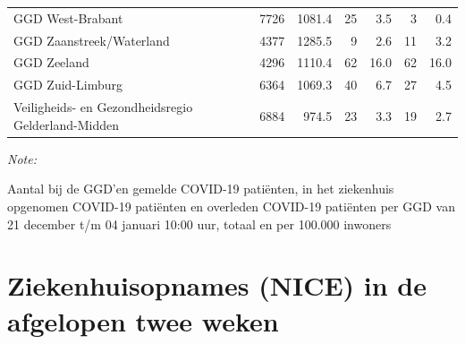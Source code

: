 \documentclass[
  english,
  man,floatsintext]{apa6}
\begin{document}
\begin{table}
\begin{threeparttable}
\begin{tabular}{lrrrrrr}
GGD West-Brabant & 7726 & 1081.4 & 25 & 3.5 & 3 & 0.4\\
GGD Zaanstreek/Waterland & 4377 & 1285.5 & 9 & 2.6 & 11 & 3.2\\
GGD Zeeland & 4296 & 1110.4 & 62 & 16.0 & 62 & 16.0\\
GGD Zuid-Limburg & 6364 & 1069.3 & 40 & 6.7 & 27 & 4.5\\
Veiligheids- en Gezondheidsregio Gelderland-Midden & 6884 & 974.5 & 23 & 3.3 & 19 & 2.7\\
\bottomrule
\end{tabular}
\begin{tablenotes}
\item \textit{Note: } 
\item Aantal bij de GGD’en gemelde COVID-19 patiënten, in het ziekenhuis opgenomen COVID-19 patiënten en overleden COVID-19 patiënten per GGD van 21 december t/m 04 januari 10:00 uur, totaal en per 100.000 inwoners
\end{tablenotes}
\end{threeparttable}
\endgroup{}
\end{table}

\newpage

\hypertarget{ziekenhuisopnames-nice-in-de-afgelopen-twee-weken}{%
\section{Ziekenhuisopnames (NICE) in de afgelopen twee weken}\label{ziekenhuisopnames-nice-in-de-afgelopen-twee-weken}}
\end{document}

